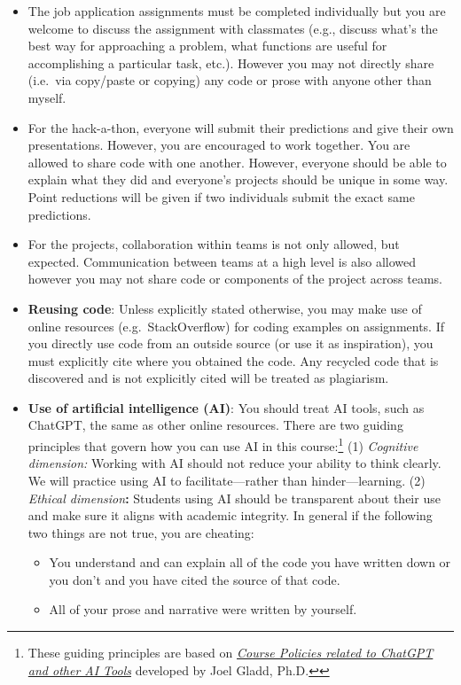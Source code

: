 \documentclass[
  letterpaper,
  DIV=11,
  numbers=noendperiod]{scrartcl}
\begin{document}
\begin{itemize}
\item
  The job application assignments must be completed individually but you
  are welcome to discuss the assignment with classmates (e.g., discuss
  what's the best way for approaching a problem, what functions are
  useful for accomplishing a particular task, etc.). However you may not
  directly share (i.e.~via copy/paste or copying) any code or prose with
  anyone other than myself.
\item
  For the hack-a-thon, everyone will submit their predictions and give
  their own presentations. However, you are encouraged to work together.
  You are allowed to share code with one another. However, everyone
  should be able to explain what they did and everyone's projects should
  be unique in some way. Point reductions will be given if two
  individuals submit the exact same predictions.
\item
  For the projects, collaboration within teams is not only allowed, but
  expected. Communication between teams at a high level is also allowed
  however you may not share code or components of the project across
  teams.
\item
  \textbf{Reusing code}: Unless explicitly stated otherwise, you may
  make use of online resources (e.g.~StackOverflow) for coding examples
  on assignments. If you directly use code from an outside source (or
  use it as inspiration), you must explicitly cite where you obtained
  the code. Any recycled code that is discovered and is not explicitly
  cited will be treated as plagiarism.
\item
  \textbf{Use of artificial intelligence (AI)}: You should treat AI
  tools, such as ChatGPT, the same as other online resources. There are
  two guiding principles that govern how you can use AI in this
  course:\footnote{These guiding principles are based on
    \href{https://docs.google.com/document/d/1WpCeTyiWCPQ9MNCsFeKMDQLSTsg1oKfNIH6MzoSFXqQ/preview}{\emph{Course
    Policies related to ChatGPT and other AI Tools}} developed by Joel
    Gladd,
    Ph.D.\href{https://sta101-f23.github.io/course-syllabus.html\#fnref1}{↩︎}}
  (1) \emph{Cognitive dimension:} Working with AI should not reduce your
  ability to think clearly. We will practice using AI to
  facilitate---rather than hinder---learning. (2) \emph{Ethical
  dimension}\textbf{:} Students using AI should be transparent about
  their use and make sure it aligns with academic integrity. In general
  if the following two things are not true, you are cheating:

  \begin{itemize}
  \item
    You understand and can explain all of the code you have written down
    or you don't and you have cited the source of that code.
  \item
    All of your prose and narrative were written by yourself.
  \end{itemize}
\end{itemize}
\end{document}
